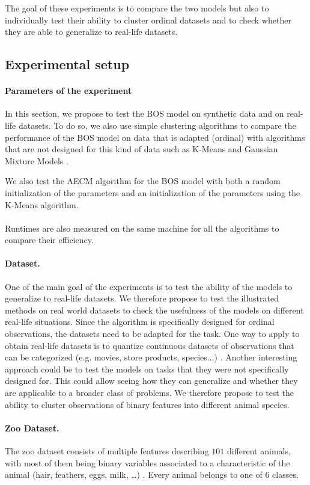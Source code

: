 \documentclass[a4paper,12pt]{article}
\begin{document}
The goal of these experiments is to compare the two models but also to individually test their ability to cluster ordinal datasets and to check whether they are able to generalize to real-life datasets. 

\subsection{Experimental setup}
\paragraph{Parameters of the experiment}
In this section, we propose to test the BOS model on synthetic data and on real-life datasets. 
To do so, we also use simple clustering algorithms to compare the performance of the BOS model on data that is adapted (ordinal) with algorithms that are not designed for this kind of data such as K-Means \citep{macqueen1967some} and Gaussian Mixture Models \citep{reynolds2009gaussian}.

We also test the AECM algorithm for the BOS model with both a random initialization of the parameters and an initialization of the parameters using the K-Means algorithm. \\ \\
Runtimes are also measured on the same machine for all the algorithms to compare their efficiency.
\paragraph{Dataset.} One of the main goal of the experiments is to test the ability of the models to generalize to real-life datasets. We therefore propose to test the illustrated methods on real world datasets to check the usefulness of the models on different real-life situations. Since the algorithm is specifically designed for ordinal observations, the datasets need to be adapted for the task. One way to apply to obtain real-life datasets is to quantize continuous datasets of observations that can be categorized (e.g. movies, store products, species...) \citep{skubacz2000quantization}. Another interesting approach could be to test the models on tasks that they were not specifically designed for. This could allow seeing how they can generalize and whether they are applicable to a broader class of problems. We therefore propose to test the ability to cluster observations of binary features into different animal species.
\paragraph{Zoo Dataset.} The zoo dataset consists of multiple features describing $101$ different animals, with most of them being binary variables associated to a characteristic of the animal (hair, feathers, eggs, milk, \ldots) \citep{misc_zoo_111}. Every animal belongs to one of $6$ classes. 
\end{document}
